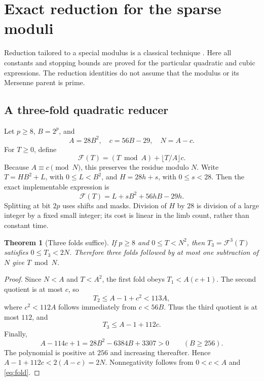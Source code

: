 \documentclass[11pt,a4paper]{article}
\newtheorem{theorem}{Theorem}[section]
\theoremstyle{definition}
\begin{document}
\section{Exact reduction for the sparse moduli}
\label{sec:reduction}

Reduction tailored to a special modulus is a classical technique
\cite{solinas,bajard}. Here all constants and stopping bounds are proved
for the particular quadratic and cubic expressions. The reduction identities
do not assume that the modulus or its Mersenne parent is prime.

\subsection{A three-fold quadratic reducer}

Let $p\ge8$, $B=2^p$, and
\begin{equation}\label{eq:Acquad}
 A=28B^2,\quad c=56B-29,\quad N=A-c.
\end{equation}
For $T\ge0$, define
\begin{equation}\label{eq:fold}
 \mathcal F(T)=(T\bmod A)+\lfloor T/A\rfloor c.
\end{equation}
Because $A\equiv c\pmod N$, this preserves the residue modulo $N$.
Write $T=HB^2+L$, with $0\le L<B^2$, and $H=28h+s$, with $0\le s<28$.
Then the exact implementable expression is
\begin{equation}\label{eq:foldimpl}
 \mathcal F(T)=L+sB^2+56hB-29h.
\end{equation}
Splitting at bit $2p$ uses shifts and masks. Division of $H$ by $28$ is
division of a large integer by a fixed small integer; its cost is linear
in the limb count, rather than constant time.

\begin{theorem}[Three folds suffice]\label{thm:threefold}
If $p\ge8$ and $0\le T<N^2$, then $T_3=\mathcal F^3(T)$ satisfies
$0\le T_3<2N$. Therefore three folds followed by at most one subtraction
of $N$ give $T\bmod N$.
\end{theorem}

\begin{proof}
Since $N<A$ and $T<A^2$, the first fold obeys $T_1<A(c+1)$.
The second quotient is at most $c$, so
\[
 T_2\le A-1+c^2<113A,
\]
where $c^2<112A$ follows immediately from $c<56B$.
Thus the third quotient is at most $112$, and
\[
 T_3\le A-1+112c.
\]
Finally,
\[
 A-114c+1=28B^2-6384B+3307>0\qquad(B\ge256).
\]
The polynomial is positive at $256$ and increasing thereafter. Hence
$A-1+112c<2(A-c)=2N$. Nonnegativity follows from $0<c<A$ and
\eqref{eq:fold}.
\end{proof}
\end{document}
